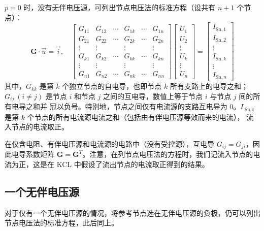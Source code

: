 \documentclass[UTF8]{report}
\def\I{\mathscr{I}}
\theoremstyle{MyLineTheoremStyle} %
\theoremstyle{MyBlockTheoremStyle} %
\theoremstyle{MySubsubsectionStyle} %
\begin{document}
$p = 0$ 时，没有无伴电压源，可列出节点电压法的标准方程（设共有 $n+1$ 个节点）：
\begin{equation}
    \boldsymbol{G}\cdot \vec{u} = \vec{i},\quad 
    \begin{bmatrix}
        G_{11}&G_{12}&\cdots&G_{1k}&\cdots&G_{1n}\\G_{21}&G_{22}&\cdots&G_{2k}&\cdots&G_{2n}\\\vdots&\vdots&&\vdots&&\vdots\\G_{k1}&G_{k2}&\cdots&G_{kk}&\cdots&G_{kn}\\\vdots&\vdots&&\vdots&&\vdots\\G_{n1}&G_{n2}&\cdots&G_{nk}&\cdots&G_{nn}\end{bmatrix}\begin{bmatrix}U_{1}\\U_{2}\\\vdots\\U_{k}\\\vdots\\U_{n}\end{bmatrix}=\begin{bmatrix}I_{\mathrm{Sn}, 1}\\I_{\mathrm{Sn}, 2}\\\vdots\\I_{\mathrm{Sn}, k}\\\vdots\\I_{\mathrm{Sn}, n}
    \end{bmatrix}
\end{equation}
其中，$G_{kk}$ 是第 $k$ 个独立节点的自电导，也即节点 $k$ 所有支路上的电导之和；$G_{ij}\ (i \ne j)$ 是节点 $i$ 和节点 $j$ 之间的互电导，数值上等于节点 $i$ 与节点 $j$ 间的所有电导之和并 {\color{red} 冠以负号}。特别地，节点之间仅有电流源的支路互电导为 0。$I_{\ \text{Sn,k}}$ 是第 $k$ 个节点的所有电流源电流之和（包括由有伴电压源等效而来的电流），{\color{red} 流入节点的电流取正}。

在仅含电阻、有伴电压源和电流源的电路中（没有受控源），互电导 $G_{ij} = G_{ji}$，因此电导系数矩阵 $\boldsymbol{G} = \boldsymbol{G}^T$。注意，在列节点电压法的方程时，我们记流入节点的电流为正，这是在 KCL 中假设了流出节点的电流取正得到的结果。

\subsection{一个无伴电压源}

对于仅有一个无伴电压源的情况，将参考节点选在无伴电压源的负极，仍可以列出节点电压法的标准方程，此后同上。
\end{document}
